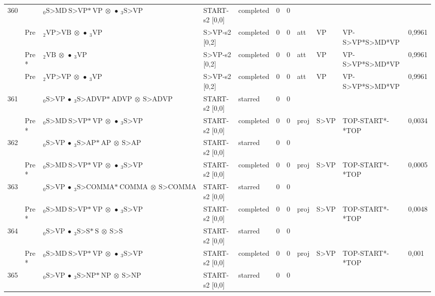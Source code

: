 \documentclass[10pt]{article}
\begin{document}
\begin{longtable}[htbp]{lllllllllll}
360 & & $ {}_0 \textrm{S>MD} \ \textrm{S>VP*} \ \textrm{VP} \  \otimes \  \bullet \ {}_{3} \textrm{S>VP} $ & START-s2 [0,0] & completed & 0 & 0 & & & & \\ 
 & Pre & $ {}_2 \textrm{VP>VB} \  \otimes \  \bullet \ {}_{3} \textrm{VP} $ & S>VP-s2 [0,2] & completed & 0 & 0 & att & VP & VP-S>VP*S>MD*VP & 0,9961 \\ 
 & Pre *& $ {}_2 \textrm{VB} \  \otimes \  \bullet \ {}_{3} \textrm{VP} $ & S>VP-s2 [0,2] & completed & 0 & 0 & att & VP & VP-S>VP*S>MD*VP & 0,9961 \\ 
 & Pre & $ {}_2 \textrm{VP>VP} \  \otimes \  \bullet \ {}_{3} \textrm{VP} $ & S>VP-s2 [0,2] & completed & 0 & 0 & att & VP & VP-S>VP*S>MD*VP & 0,9961 \\ 
361 & & $ {}_0 \textrm{S>VP} \  \bullet \ {}_{3} \textrm{S>ADVP*} \ \textrm{ADVP} \  \otimes \ \textrm{S>ADVP} $ & START-s2 [0,0] & starred & 0 & 0 & & & & \\ 
 & Pre *& $ {}_0 \textrm{S>MD} \ \textrm{S>VP*} \ \textrm{VP} \  \otimes \  \bullet \ {}_{3} \textrm{S>VP} $ & START-s2 [0,0] & completed & 0 & 0 & proj & S>VP & TOP-START*-*TOP & 0,0034 \\ 
362 & & $ {}_0 \textrm{S>VP} \  \bullet \ {}_{3} \textrm{S>AP*} \ \textrm{AP} \  \otimes \ \textrm{S>AP} $ & START-s2 [0,0] & starred & 0 & 0 & & & & \\ 
 & Pre *& $ {}_0 \textrm{S>MD} \ \textrm{S>VP*} \ \textrm{VP} \  \otimes \  \bullet \ {}_{3} \textrm{S>VP} $ & START-s2 [0,0] & completed & 0 & 0 & proj & S>VP & TOP-START*-*TOP & 0,0005 \\ 
363 & & $ {}_0 \textrm{S>VP} \  \bullet \ {}_{3} \textrm{S>COMMA*} \ \textrm{COMMA} \  \otimes \ \textrm{S>COMMA} $ & START-s2 [0,0] & starred & 0 & 0 & & & & \\ 
 & Pre *& $ {}_0 \textrm{S>MD} \ \textrm{S>VP*} \ \textrm{VP} \  \otimes \  \bullet \ {}_{3} \textrm{S>VP} $ & START-s2 [0,0] & completed & 0 & 0 & proj & S>VP & TOP-START*-*TOP & 0,0048 \\ 
364 & & $ {}_0 \textrm{S>VP} \  \bullet \ {}_{3} \textrm{S>S*} \ \textrm{S} \  \otimes \ \textrm{S>S} $ & START-s2 [0,0] & starred & 0 & 0 & & & & \\ 
 & Pre *& $ {}_0 \textrm{S>MD} \ \textrm{S>VP*} \ \textrm{VP} \  \otimes \  \bullet \ {}_{3} \textrm{S>VP} $ & START-s2 [0,0] & completed & 0 & 0 & proj & S>VP & TOP-START*-*TOP & 0,001 \\ 
365 & & $ {}_0 \textrm{S>VP} \  \bullet \ {}_{3} \textrm{S>NP*} \ \textrm{NP} \  \otimes \ \textrm{S>NP} $ & START-s2 [0,0] & starred & 0 & 0 & & & & \\ 

\end{longtable}
\end{document}
